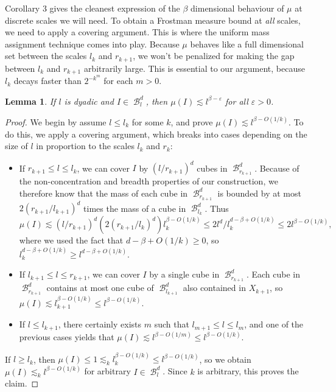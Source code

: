 \documentclass[dvipsnames,letterpaper,12pt]{article}
\numberwithin{equation}{section}
\theoremstyle{plain}
\newtheorem{lemma}{Lemma}
\DeclareMathOperator{\B}{\mathcal{B}}
\begin{document}
Corollary 3 gives the cleanest expression of the $\beta$ dimensional behaviour of $\mu$ at discrete scales we will need. To obtain a Frostman measure bound at {\it all} scales, we need to apply a covering argument. This is where the uniform mass assignment technique comes into play. Because $\mu$ behaves like a full dimensional set between the scales $l_k$ and $r_{k+1}$, we won't be penalized for making the gap between $l_k$ and $r_{k+1}$ arbitrarily large. This is essential to our argument, because $l_k$ decays faster than $2^{-k^m}$ for each $m > 0$.

\begin{lemma}
	If $l$ is dyadic and $I \in \B_l^d$, then $\mu(I) \lesssim l^{\beta - \varepsilon}$ for all $\varepsilon > 0$.
\end{lemma}
\begin{proof}
	We begin by assume $l \leq l_k$ for some $k$, and prove $\mu(I) \lesssim l^{\beta - O(1/k)}$. To do this, we apply a covering argument, which breaks into cases depending on the size of $l$ in proportion to the scales $l_k$ and $r_k$:
	\begin{itemize}
		\item If $r_{k+1} \leq l \leq l_k$, we can cover $I$ by $(l/r_{k+1})^d$ cubes in $\B^d_{r_{k+1}}$. Because of the non-concentration and breadth properties of our construction, we therefore know that the mass of each cube in $\B^d_{r_{k+1}}$ is bounded by at most $2 (r_{k+1}/l_{k+1})^d$ times the mass of a cube in $\B_{l_k}^d$. Thus
		\[ \mu(I) \lesssim (l/r_{k+1})^d (2(r_{k+1}/l_k)^d) l_k^{\beta - O(1/k)} \leq 2l^d/l_k^{d - \beta + O(1/k)} \leq 2l^{\beta - O(1/k)}, \]
		where we used the fact that $d - \beta + O(1/k) \geq 0$, so $l_k^{d - \beta + O(1/k)} \geq l^{d - \beta + O(1/k)}$.

		\item If $l_{k+1} \leq l \leq r_{k+1}$, we can cover $I$ by a single cube in $\B^d_{r_{k+1}}$. Each cube in $\B^d_{r_{k+1}}$ contains at most one cube of $\B^d_{l_{k+1}}$ also contained in $X_{k+1}$, so $\mu(I) \lesssim l_{k+1}^{\beta - O(1/k)} \leq l^{\beta - O(1/k)}$.

		\item If $l \leq l_{k+1}$, there certainly exists $m$ such that $l_{m+1} \leq l \leq l_m$, and one of the previous cases yields that $\mu(I) \lesssim l^{\beta - O(1/m)} \leq l^{\beta - O(1/k)}$.
	\end{itemize}
	If $l \geq l_k$, then $\mu(I) \leq 1 \lesssim_k l_k^{\beta - O(1/k)} \leq l^{\beta - O(1/k)}$, so we obtain $\mu(I) \lesssim_k l^{\beta - O(1/k)}$ for arbitrary $I \in \B_l^d$. Since $k$ is arbitrary, this proves the claim.
\end{proof}
\end{document}
